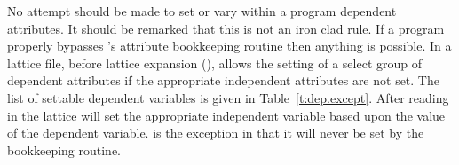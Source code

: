 No attempt should be made to set or vary within a program dependent
attributes. It should be remarked that this is not an iron clad rule.
If a program properly bypasses \bmad's attribute bookkeeping routine
then anything is possible. In a lattice file, before lattice expansion
(), \bmad allows the setting of a select group of
dependent attributes if the appropriate independent attributes are
not set. The list of settable dependent variables is given in
Table~\ref{t:dep.except}.  After reading in the lattice \bmad will set
the appropriate independent variable based upon the value of the
dependent variable.  is the exception in that it will never
be set by the bookkeeping routine.
\begin{table}[ht]
\caption {Dependent variables that can be set in a primary lattice file.}
\label{t:dep.except}
\end{table}

